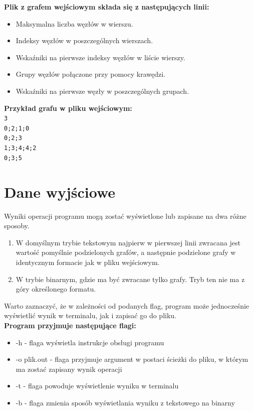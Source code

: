\documentclass{article}
\begin{document}
\textbf{Plik z grafem wejściowym składa się z następujących linii:}

\begin{itemize}
  \item Maksymalna liczba węzłów w wierszu.
  \item Indeksy węzłów w poszczególnych wierszach.
  \item Wskaźniki na pierwsze indeksy węzłów w liście wierszy.
  \item Grupy węzłów połączone przy pomocy krawędzi.
  \item Wskaźniki na pierwsze węzły w poszczególnych grupach.
\end{itemize}
\textbf{Przykład grafu w pliku wejściowym:}\\
\texttt{3\\0;2;1;0\\0;2;3\\1;3;4;4;2\\0;3;5}

\section*{Dane wyjściowe}
Wyniki operacji programu mogą zostać wyświetlone lub zapisane na dwa różne sposoby.
\begin{enumerate}
\item W domyślnym trybie tekstowym najpierw w pierwszej linii zwracana jest wartość pomyślnie podzielonych grafów, a następnie podzielone grafy w identycznym formacie jak w pliku wejściowym.

\item W trybie binarnym, gdzie ma być zwracane tylko grafy. Tryb ten nie ma z góry określonego formatu.
\end{enumerate}

Warto zaznaczyć, że w zależności od podanych flag, program może jednocześnie wyświetlić wynik w terminalu, jak i zapisać go do pliku.\\

\textbf{Program przyjmuje następujące flagi:}
\begin{itemize}
\item -h - flaga wyświetla instrukcje obsługi programu

\item -o plik.out - flaga przyjmuje argument w postaci ścieżki do pliku, w którym ma zostać zapisany wynik operacji

\item -t - flaga powoduje wyświetlenie wyniku w terminalu

\item -b - flaga zmienia sposób wyświetlania wyniku z tekstowego na binarny
\end{itemize}
\end{document}

